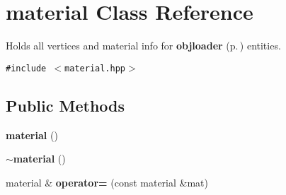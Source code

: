 \section{material  Class Reference}
\label{classmaterial}
Holds all vertices and material info for {\bf objloader} {\rm (p.\,\pageref{classobjloader})} entities. 


{\tt \#include $<$material.hpp$>$}

\subsection*{Public Methods}
\begin{CompactItemize}
\item 
{}
{\bf material} ()\label{classmaterial_a0}

\item 
{}
{\bf $\sim$material} ()\label{classmaterial_a1}

\item 
{}
material \& {\bf operator=} (const material \&mat)\label{classmaterial_a2}

\end{CompactItemize}
